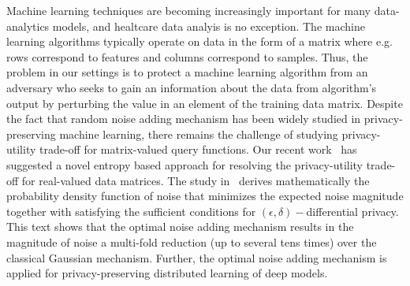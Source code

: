 \noindent
Machine learning techniques are becoming increasingly important for many data-analytics models, and healtcare data analyis is no exception. The machine learning algorithms typically operate on data in the form of a matrix where e.g. rows correspond to features and columns correspond to samples. Thus, the problem in our settings is to protect a machine learning algorithm from an adversary who seeks to gain an information about the data from algorithm's output by perturbing the value in an element of the training data matrix. Despite the fact that random noise adding mechanism has been widely studied in privacy-preserving machine learning, there remains the challenge of studying privacy-utility trade-off for matrix-valued query functions. Our recent work~\cite{Kumar/IWCFS2019} has suggested a novel entropy based approach for resolving the privacy-utility trade-off for real-valued data matrices. The study in~\cite{Kumar/IWCFS2019} derives mathematically the probability density function of noise that minimizes the expected noise magnitude together with satisfying the sufficient conditions for $(\epsilon,\delta)-$differential privacy. This text shows that the optimal noise adding mechanism results in the magnitude of noise a multi-fold reduction (up to several tens times) over the classical Gaussian mechanism. Further, the optimal noise adding mechanism is applied for privacy-preserving distributed learning of deep models.  


